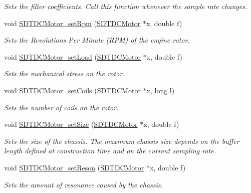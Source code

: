 \begin{DoxyCompactItemize}
\begin{DoxyCompactList}\small\item\em Sets the filter coefficients. Call this function whenever the sample rate changes. \end{DoxyCompactList}\item 
void \hyperlink{group__dcmotor_ga29e28c4889291a8167940ad159211c6b}{S\+D\+T\+D\+C\+Motor\+\_\+set\+Rpm} (\hyperlink{group__dcmotor_ga55042fc98f1704ef2f8dd270e90c4cef}{S\+D\+T\+D\+C\+Motor} $\ast$x, double f)
\begin{DoxyCompactList}\small\item\em Sets the Revolutions Per Minute (R\+P\+M) of the engine rotor. \end{DoxyCompactList}\item 
void \hyperlink{group__dcmotor_ga070ad631ae1c5059497ebcd05b0d8b39}{S\+D\+T\+D\+C\+Motor\+\_\+set\+Load} (\hyperlink{group__dcmotor_ga55042fc98f1704ef2f8dd270e90c4cef}{S\+D\+T\+D\+C\+Motor} $\ast$x, double f)
\begin{DoxyCompactList}\small\item\em Sets the mechanical stress on the rotor. \end{DoxyCompactList}\item 
void \hyperlink{group__dcmotor_gad097108d217e31d104f3aa667be48cb2}{S\+D\+T\+D\+C\+Motor\+\_\+set\+Coils} (\hyperlink{group__dcmotor_ga55042fc98f1704ef2f8dd270e90c4cef}{S\+D\+T\+D\+C\+Motor} $\ast$x, long l)
\begin{DoxyCompactList}\small\item\em Sets the number of coils on the rotor. \end{DoxyCompactList}\item 
void \hyperlink{group__dcmotor_gacbbac17dfb5b44eb180c8c275deb3567}{S\+D\+T\+D\+C\+Motor\+\_\+set\+Size} (\hyperlink{group__dcmotor_ga55042fc98f1704ef2f8dd270e90c4cef}{S\+D\+T\+D\+C\+Motor} $\ast$x, double f)
\begin{DoxyCompactList}\small\item\em Sets the size of the chassis. The maximum chassis size depends on the buffer length defined at construction time and on the current sampling rate. \end{DoxyCompactList}\item 
void \hyperlink{group__dcmotor_ga0c98a28412de74c1407788792a38297a}{S\+D\+T\+D\+C\+Motor\+\_\+set\+Reson} (\hyperlink{group__dcmotor_ga55042fc98f1704ef2f8dd270e90c4cef}{S\+D\+T\+D\+C\+Motor} $\ast$x, double f)
\begin{DoxyCompactList}\small\item\em Sets the amount of resonance caused by the chassis. \end{DoxyCompactList}\item 

\end{DoxyCompactItemize}

